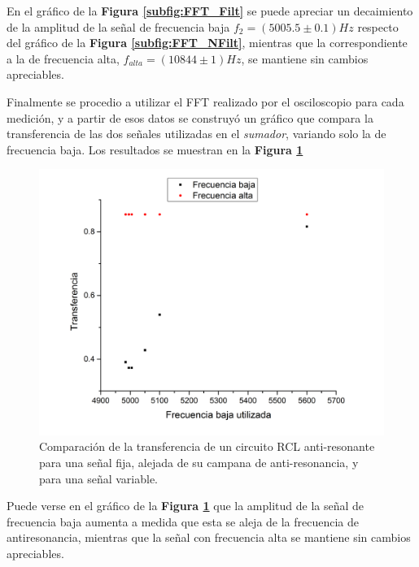 \documentclass[11pt,a4paper]{article}
\begin{document}
En el gráfico de la \textbf{Figura \ref{subfig:FFT_Filt}} se puede apreciar un decaimiento de la amplitud de la señal de frecuencia baja $f_{2}= (5005.5 \pm 0.1)Hz$ respecto del gráfico de la \textbf{Figura \ref{subfig:FFT_NFilt}}, mientras que la correspondiente a la de frecuencia alta, $f_{alta} = (10844 \pm 1)Hz$, se mantiene sin cambios apreciables.

Finalmente se procedio a utilizar el FFT realizado por el osciloscopio para cada medición, y a partir de esos datos se construyó un gráfico que compara la transferencia de las dos señales utilizadas en el \textit{sumador}, variando solo la de frecuencia baja. Los resultados se muestran en la \textbf{Figura \ref{fig:Comp}}

\begin{figure}[H]
\centering
\includegraphics[scale=0.4]{Comparacion}
\caption{Comparación de la transferencia de un circuito RCL anti-resonante para una señal fija, alejada de su campana de anti-resonancia, y para una señal variable.}
\label{fig:Comp}
\end{figure}

Puede verse en el gráfico de la \textbf{Figura \ref{fig:Comp}} que la amplitud de la señal de frecuencia baja aumenta a medida que esta se aleja de la frecuencia de antiresonancia, mientras que la señal con frecuencia alta se mantiene sin cambios apreciables.


\end{document}
